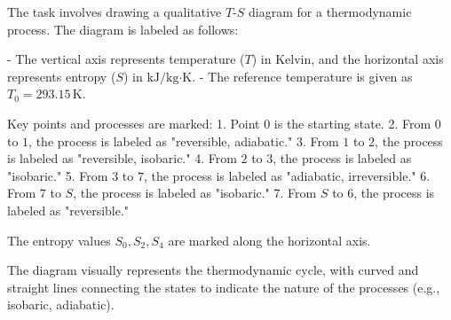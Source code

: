 The task involves drawing a qualitative \( T \)-\( S \) diagram for a thermodynamic process. The diagram is labeled as follows:

- The vertical axis represents temperature (\( T \)) in Kelvin, and the horizontal axis represents entropy (\( S \)) in \( \text{kJ}/\text{kg·K} \).  
- The reference temperature is given as \( T_0 = 293.15 \, \text{K} \).  

Key points and processes are marked:  
1. Point \( 0 \) is the starting state.  
2. From \( 0 \) to \( 1 \), the process is labeled as "reversible, adiabatic."  
3. From \( 1 \) to \( 2 \), the process is labeled as "reversible, isobaric."  
4. From \( 2 \) to \( 3 \), the process is labeled as "isobaric."  
5. From \( 3 \) to \( 7 \), the process is labeled as "adiabatic, irreversible."  
6. From \( 7 \) to \( S \), the process is labeled as "isobaric."  
7. From \( S \) to \( 6 \), the process is labeled as "reversible."  

The entropy values \( S_0, S_2, S_4 \) are marked along the horizontal axis.  

The diagram visually represents the thermodynamic cycle, with curved and straight lines connecting the states to indicate the nature of the processes (e.g., isobaric, adiabatic).